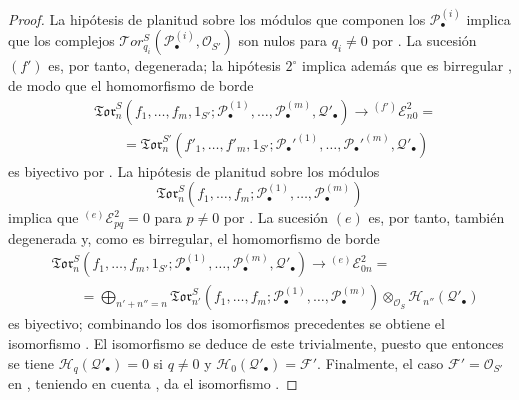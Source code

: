 \documentclass[10pt,oneside,openany]{book}
\theoremstyle{egaenv}\newtheorem*{env}{---}
\theoremstyle{egastatement}
\theoremstyle{egadescription}
\begin{document}
\begin{proof}
La hipótesis de planitud sobre los módulos que componen los
$\mathscr P_\bullet^{(i)}$ implica que los complejos
$\mathscr{T}\!or_{q_i}^S(\mathscr P_\bullet^{(i)},\mathscr O_{S'})$ son nulos
para $q_i\ne0$ por . La sucesión $(f')$ es, por tanto,
degenerada; la hipótesis $2^\circ$ implica además que es birregular
, de modo que el homomorfismo de borde
\[
\begin{split}
  &\mathfrak{Tor}_n^S
  (f_1,\ldots,f_m,1_{S'};
   \mathscr P_\bullet^{(1)},\ldots,
   \mathscr P_\bullet^{(m)},\mathscr Q'_\bullet)
  \longrightarrow {}^{(f')}\mathscr E_{n0}^2=\\
  &\qquad=
  \mathfrak{Tor}_n^{S'}
  (f'_1,\ldots,f'_m,1_{S'};
   \mathscr P_\bullet'^{(1)},\ldots,
   \mathscr P_\bullet'^{(m)},\mathscr Q'_\bullet)
\end{split}
\tag{6.9.6.4}\label{III.6.9.6.4.fr}
\]
es biyectivo por . La hipótesis de planitud sobre los
módulos
\[
  \mathfrak{Tor}_n^S
  (f_1,\ldots,f_m;
   \mathscr P_\bullet^{(1)},\ldots,\mathscr P_\bullet^{(m)})
\]
implica que ${}^{(e)}\mathscr E_{pq}^2=0$ para $p\ne0$ por
. La sucesión $(e)$ es, por tanto, también degenerada y, como
es birregular, el homomorfismo de borde
\[
\begin{split}
  &\mathfrak{Tor}_n^S
  (f_1,\ldots,f_m,1_{S'};
   \mathscr P_\bullet^{(1)},\ldots,
   \mathscr P_\bullet^{(m)},\mathscr Q'_\bullet)
  \longrightarrow {}^{(e)}\mathscr E_{0n}^2=\\
  &\qquad=
  \bigoplus_{n'+n''=n}
  \mathfrak{Tor}_{n'}^S
  (f_1,\ldots,f_m;
   \mathscr P_\bullet^{(1)},\ldots,
   \mathscr P_\bullet^{(m)})
  \otimes_{\mathscr O_S}\mathscr H_{n''}(\mathscr Q'_\bullet)
\end{split}
\tag{6.9.6.5}\label{III.6.9.6.5.fr}
\]
es biyectivo; combinando los dos isomorfismos precedentes se obtiene el
isomorfismo . El isomorfismo  se deduce
de este trivialmente, puesto que entonces se tiene
$\mathscr H_q(\mathscr Q'_\bullet)=0$ si $q\ne0$ y
$\mathscr H_0(\mathscr Q'_\bullet)=\mathscr F'$. Finalmente, el caso
$\mathscr F'=\mathscr O_{S'}$ en , teniendo en cuenta
, da el isomorfismo .
\end{proof}
\end{document}
